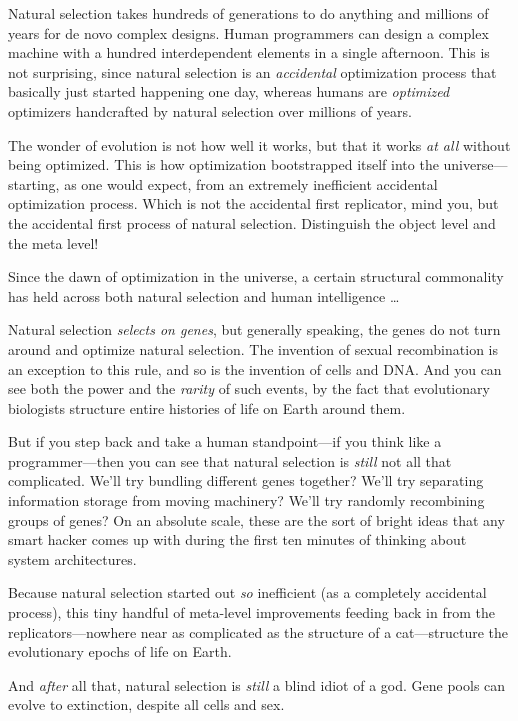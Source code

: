 {
 Natural selection takes hundreds of generations to do anything and
millions of years for de novo complex designs. Human programmers can
design a complex machine with a hundred interdependent elements in a
single afternoon. This is not surprising, since natural selection is an
\textit{accidental} optimization process that basically just started
happening one day, whereas humans are \textit{optimized} optimizers
handcrafted by natural selection over millions of years.}

{
 The wonder of evolution is not how well it works, but that it
works \textit{at all} without being optimized. This is how optimization
bootstrapped itself into the universe---starting, as one would expect,
from an extremely inefficient accidental optimization process. Which is
not the accidental first replicator, mind you, but the accidental first
process of natural selection. Distinguish the object level and the meta
level!}

{
 Since the dawn of optimization in the universe, a certain
structural commonality has held across both natural selection and human
intelligence \ldots}

{
 Natural selection \textit{selects on genes}, but generally
speaking, the genes do not turn around and optimize natural selection.
The invention of sexual recombination is an exception to this rule, and
so is the invention of cells and DNA. And you can see both the power
and the \textit{rarity} of such events, by the fact that evolutionary
biologists structure entire histories of life on Earth around them.}

{
 But if you step back and take a human standpoint---if you think
like a programmer---then you can see that natural selection is
\textit{still} not all that complicated. We'll try
bundling different genes together? We'll try separating
information storage from moving machinery? We'll try
randomly recombining groups of genes? On an absolute scale, these are
the sort of bright ideas that any smart hacker comes up with during the
first ten minutes of thinking about system architectures.}

{
 Because natural selection started out \textit{so} inefficient (as
a completely accidental process), this tiny handful of meta-level
improvements feeding back in from the replicators---nowhere near as
complicated as the structure of a cat---structure the evolutionary
epochs of life on Earth.}

{
 And \textit{after} all that, natural selection is \textit{still} a
blind idiot of a god. Gene pools can evolve to extinction, despite all
cells and sex.}

